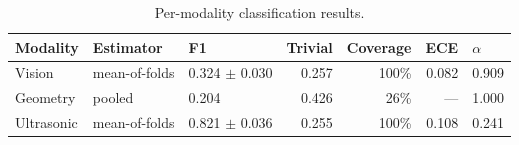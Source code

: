 \begin{table}[htbp]
\centering
\caption{Per-modality classification results.}
\label{tab:modality}
\begin{tabular}{@{}lllrrrl@{}}
\toprule
Modality & Estimator & F1 & Trivial & Coverage & ECE & $\alpha$ \\
\midrule
Vision & mean-of-folds & 0.324 $\pm$ 0.030 & 0.257 & 100\% & 0.082 & 0.909 \\
Geometry & pooled & 0.204 & 0.426 & 26\% & --- & 1.000 \\
Ultrasonic & mean-of-folds & 0.821 $\pm$ 0.036 & 0.255 & 100\% & 0.108 & 0.241 \\
\bottomrule
\end{tabular}
\end{table}
